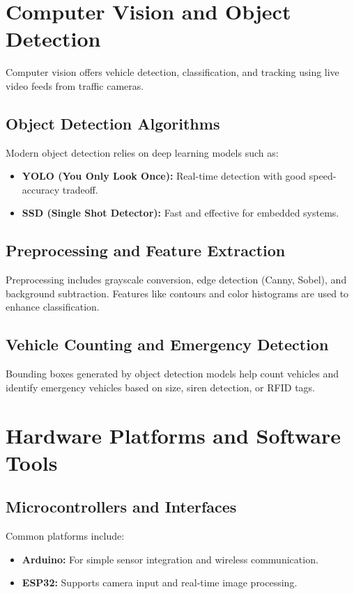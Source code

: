 \documentclass[12pt]{report}
\begin{document}
\section{Computer Vision and Object Detection}

Computer vision offers vehicle detection, classification, and tracking using live video feeds from traffic cameras.

\subsection{Object Detection Algorithms}
Modern object detection relies on deep learning models such as:
\begin{itemize}
    \item \textbf{YOLO (You Only Look Once):} Real-time detection with good speed-accuracy tradeoff.
    \item \textbf{SSD (Single Shot Detector):} Fast and effective for embedded systems.
    
\end{itemize}

\subsection{Preprocessing and Feature Extraction}
Preprocessing includes grayscale conversion, edge detection (Canny, Sobel), and background subtraction. Features like contours and color histograms are used to enhance classification.

\subsection{Vehicle Counting and Emergency Detection}
Bounding boxes generated by object detection models help count vehicles and identify emergency vehicles based on size, siren detection, or RFID tags.


\section{Hardware Platforms and Software Tools}

\subsection{Microcontrollers and Interfaces}
Common platforms include:
\begin{itemize}
    \item \textbf{Arduino:} For simple sensor integration and wireless communication.
    \item \textbf{ESP32:} Supports camera input and real-time image processing.
\end{itemize}
\end{document}
